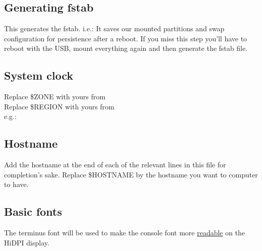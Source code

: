\subsection{Generating fstab}

\begin{blocksection}
	This generates the fstab. i.e.: It saves our mounted partitions and swap configuration for persistence after a reboot. If you miss this step you'll have to reboot with the USB, mount everything again and then generate the fstab file.
\end{blocksection}

\subsection{System clock}

\begin{blocksection}
	Replace \textcolor{codekeyword1}{\$ZONE} with yours from \\
	Replace \textcolor{codekeyword1}{\$REGION} with yours from \\
	e.g.: 
\end{blocksection}

\subsection{Hostname}

\begin{blocksection}
	Add the hostname at the end of each of the relevant lines in this file for completion's sake. Replace \textcolor{codekeyword1}{\$HOSTNAME} by the hostname you want to computer to have.
\end{blocksection}

\subsection{Basic fonts}

\begin{blocksection}
	The terminus font will be used to make the console font more \href{https://wiki.archlinux.org/index.php/HiDPI#Linux_console}{readable} on the HiDPI display.
\end{blocksection}


